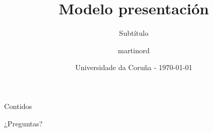 \documentclass{beamer}
\begin{document}
\title {Modelo presentación}

\subtitle {Subtítulo}

\author [martinord] 
		{martinord}

\date{Universidade da Coruña - \today}


\begin{frame}
\titlepage
\end{frame}

\begin{frame}{Contidos}
\tableofcontents
\end{frame}



\begin{frame}
	\centering
	\Huge ¿Preguntas?
\end{frame}
\end{document}
